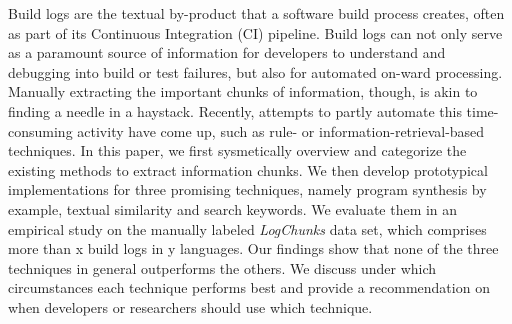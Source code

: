 Build logs are the textual by-product that a software build process
creates, often as part of its Continuous Integration (CI)
pipeline. Build logs can not only serve as a paramount source of
information for developers to understand and debugging into build or
test failures, but also for automated on-ward processing. Manually
extracting the important chunks of information, though, is akin to
finding a needle in a haystack. Recently, attempts to partly automate
this time-consuming activity have come up, such as rule- or
information-retrieval-based techniques.
In this paper, we first sysmetically overview and categorize the existing methods to extract information chunks. We then develop prototypical implementations for three promising techniques, namely program synthesis
by example, textual similarity and search keywords. We evaluate them in an empirical study on the manually
labeled \emph{LogChunks} data set, which comprises more than x build logs in y languages.
Our findings show that none of the three techniques in general outperforms
the others. We discuss under which circumstances each technique performs best
and provide a recommendation on when developers or researchers should use which
technique.

